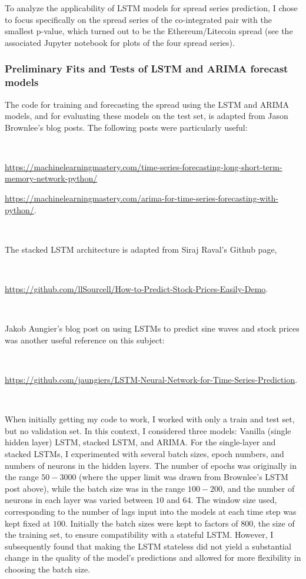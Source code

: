 \documentclass{article}
\begin{document}
To analyze the applicability of LSTM models for spread series prediction, I chose to focus specifically on the spread series of the co-integrated pair with the smallest p-value, which turned out to be the Ethereum/Litecoin spread (see the associated Jupyter notebook for plots of the four spread series).

\subsubsection{Preliminary Fits and Tests of LSTM and ARIMA forecast models}

The code for training and forecasting the spread using the LSTM and ARIMA models, and for evaluating these models on the test set, is adapted from Jason Brownlee's blog posts. The following posts were particularly useful:

\

\noindent \url{https://machinelearningmastery.com/time-series-forecasting-long-short-term-memory-network-python/}

\noindent \url{https://machinelearningmastery.com/arima-for-time-series-forecasting-with-python/}.

\

\noindent The stacked LSTM architecture is adapted from Siraj Raval's Github page,

\

\noindent \url{https://github.com/llSourcell/How-to-Predict-Stock-Prices-Easily-Demo}.

\

\noindent Jakob Aungier's blog post on using LSTMs to predict sine waves and stock prices was another useful reference on this subject:  

\

\noindent \url{https://github.com/jaungiers/LSTM-Neural-Network-for-Time-Series-Prediction}.

\

When initially getting my code to work, I worked with only a train and test set, but no validation set. In this context, I considered three models: Vanilla (single hidden layer) LSTM, stacked LSTM, and ARIMA. For the single-layer and stacked LSTMs, I experimented with several batch sizes, epoch numbers, and numbers of neurons in the hidden layers. The number of epochs was originally in the range $50 - 3000$ (where the upper limit was drawn from Brownlee's LSTM post above), while the batch size was in the range $100 - 200$, and the number of neurons in each layer was varied between $10$ and $64$. The window size used, corresponding to the number of lags input into the models at each time step was kept fixed at $100$. Initially the batch sizes were kept to factors of $800$, the size of the training set, to ensure compatibility with a stateful LSTM. However, I subsequently found that making the LSTM stateless did not yield a substantial change in the quality of the model's predictions and allowed for more flexibility in choosing the batch size.  
\end{document}
